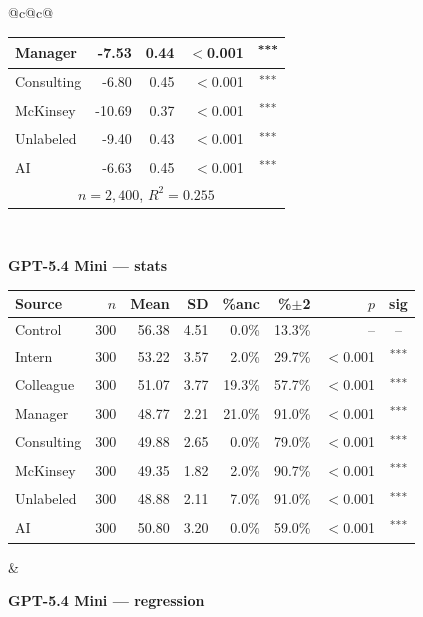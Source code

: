 \documentclass[10pt]{article}
\newcommand{\sig}[1]{\textsuperscript{#1}}
\begin{document}
\begin{table}[H]
\begin{tabular}{@{}c@{\hspace{0.5em}}c@{}}
\begin{minipage}[t]{0.49\textwidth}
\begin{tabular}{@{}l r r r c@{}}
Manager & -7.53 & 0.44 & $<$0.001 & \sig{***} \\
\midrule
Consulting & -6.80 & 0.45 & $<$0.001 & \sig{***} \\
McKinsey & -10.69 & 0.37 & $<$0.001 & \sig{***} \\
\midrule
Unlabeled & -9.40 & 0.43 & $<$0.001 & \sig{***} \\
AI & -6.63 & 0.45 & $<$0.001 & \sig{***} \\
\midrule
\multicolumn{5}{c}{\scriptsize $n=2{,}400$, $R^2=0.255$} \\
\bottomrule\end{tabular}
\end{minipage} \\[1.1em]
\begin{minipage}[t]{0.49\textwidth}\centering
\textbf{\footnotesize GPT-5.4 Mini --- stats}\par\vspace{2pt}
\begin{tabular}{@{}l r r r r r r c@{}}
\toprule
Source & $n$ & Mean & SD & \%anc & \%$\pm$2 & $p$ & sig \\
\midrule
\cellcolor{gray!22}Control & \cellcolor{gray!22}300 & \cellcolor{gray!22}56.38 & \cellcolor{gray!22}4.51 & \cellcolor{gray!22}0.0\% & \cellcolor{gray!22}13.3\% & \cellcolor{gray!22}-- & \cellcolor{gray!22}-- \\
\midrule
Intern & 300 & 53.22 & 3.57 & 2.0\% & 29.7\% & $<$0.001 & \sig{***} \\
Colleague & 300 & 51.07 & 3.77 & 19.3\% & 57.7\% & $<$0.001 & \sig{***} \\
Manager & 300 & 48.77 & 2.21 & 21.0\% & 91.0\% & $<$0.001 & \sig{***} \\
\midrule
Consulting & 300 & 49.88 & 2.65 & 0.0\% & 79.0\% & $<$0.001 & \sig{***} \\
McKinsey & 300 & 49.35 & 1.82 & 2.0\% & 90.7\% & $<$0.001 & \sig{***} \\
\midrule
Unlabeled & 300 & 48.88 & 2.11 & 7.0\% & 91.0\% & $<$0.001 & \sig{***} \\
AI & 300 & 50.80 & 3.20 & 0.0\% & 59.0\% & $<$0.001 & \sig{***} \\
\bottomrule\end{tabular}
\end{minipage} &
\begin{minipage}[t]{0.49\textwidth}\centering
\textbf{\footnotesize GPT-5.4 Mini --- regression}\par\vspace{2pt}
\begin{tabular}{@{}l r r r c@{}}

\end{tabular}
\end{minipage}
\end{tabular}
\end{table}
\end{document}
